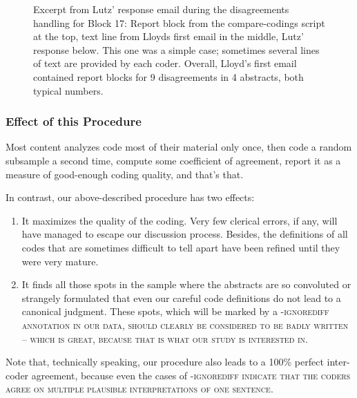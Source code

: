 \documentclass[10pt,journal,compsoc]{IEEEtran}
\newcommand{\Cb}[1]{\bgroup\scshape #1\egroup}  %
\newcommand{\Prg}[1]{\bgroup\ttfamily #1\egroup}  %
\begin{document}
\begin{figure}[tbp]%
	\centering{}%
	\vspace{-2mm}\caption{Excerpt from Lutz' response email during the disagreements handling
		for Block 17:
		Report block from the \Prg{compare-codings} script at the top,
		text line from Lloyds first email in the middle,
		Lutz' response below.
		This one was a simple case;
		sometimes several lines of text are provided by each coder.
		Overall, Lloyd's first email contained report blocks for 9 disagreements
		in 4 abstracts, both typical numbers.}\label{email-MeyAlmKel22.png}%
\end{figure}


\subsubsection{Effect of this Procedure}

Most content analyzes code most of their material only once,
then code a random subsample a second time,
compute some coefficient of agreement,
report it as a measure of good-enough coding quality,
and that's that.

In contrast, our above-described procedure has two effects:
\begin{enumerate}
	\item It maximizes the quality of the coding.
	  Very few clerical errors, if any, will have managed to escape our discussion process.
	  Besides, the definitions of all codes that are sometimes difficult to tell apart
	  have been refined until they were very mature.
	\item It finds all those spots in the sample where the abstracts are so convoluted
	  or strangely formulated that even our careful code definitions do not lead
	  to a canonical judgment.
	  These spots, which will be marked by a \Cb{-ignorediff} annotation in our data,
	  should clearly be considered to be badly written -- which is great,
	  because that is what our study is interested in.
\end{enumerate}
Note that, technically speaking, our procedure also leads to a 100\% perfect inter-coder agreement,
because even the cases of \Cb{-ignorediff} indicate that
the coders agree on multiple plausible interpretations of one sentence.
\end{document}
